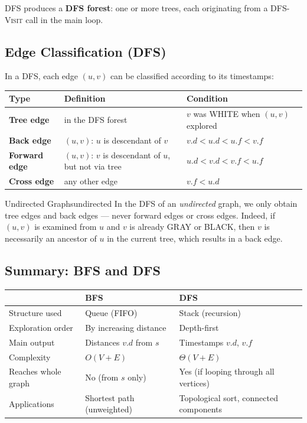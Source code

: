 DFS produces a \textbf{DFS forest}: one or more trees, each originating
from a \textsc{DFS-Visit} call in the main loop.

\subsection{Edge Classification (DFS)}

In a DFS, each edge $(u,v)$ can be classified according to its timestamps:

\begin{center}
\renewcommand{\arraystretch}{1.35}
\begin{tabular}{lll}
\toprule
\textbf{Type} & \textbf{Definition} & \textbf{Condition} \\
\midrule
\textbf{Tree edge}    & in the DFS forest & $v$ was WHITE when $(u,v)$ explored \\
\textbf{Back edge}    & $(u,v)$: $u$ is descendant of $v$ & $v.d < u.d < u.f < v.f$ \\
\textbf{Forward edge} & $(u,v)$: $v$ is descendant of $u$, \newline but not via tree & $u.d < v.d < v.f < u.f$ \\
\textbf{Cross edge}   & any other edge & $v.f < u.d$ \\
\bottomrule
\end{tabular}
\end{center}

\begin{remark}{Undirected Graphs}{undirected}
In the DFS of an \emph{undirected} graph, we only obtain tree edges and
back edges — never forward edges or cross edges. Indeed, if $(u,v)$ is examined
from $u$ and $v$ is already GRAY or BLACK, then $v$ is necessarily an ancestor
of $u$ in the current tree, which results in a back edge.
\end{remark}

\subsection{Summary: BFS and DFS}

\begin{center}
\renewcommand{\arraystretch}{1.45}
\begin{tabular}{lll}
\toprule
& \textbf{BFS} & \textbf{DFS} \\
\midrule
Structure used & Queue (FIFO) & Stack (recursion) \\
Exploration order & By increasing distance & Depth-first \\
Main output & Distances $v.d$ from $s$ & Timestamps $v.d$, $v.f$ \\
Complexity & $O(V+E)$ & $\Theta(V+E)$ \\
Reaches whole graph & No (from $s$ only) & Yes (if looping through all vertices) \\
Applications & Shortest path (unweighted) & Topological sort, connected components \\
\bottomrule
\end{tabular}
\end{center}